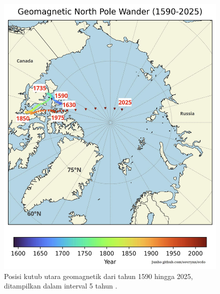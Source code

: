 \documentclass[10pt,twocolumn,letterpaper]{article}
\begin{document}
\begin{figure}[t]
\begin{center}
   \includegraphics[width=1\linewidth]{npw.jpg}
\end{center}
   \caption{Posisi kutub utara geomagnetik dari tahun 1590 hingga 2025, ditampilkan dalam interval 5 tahun \cite{142}.}
\label{fig:13}
\label{fig:onecol}
\end{figure}
\end{document}
